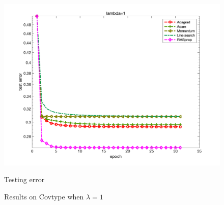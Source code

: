 \documentclass{article}
\begin{document}
\begin{figure}[H]
\begin{minipage}{0.33\linewidth}
		\includegraphics[width=1\linewidth]{./fig/err_c2}
		\caption{Testing error}
	\end{minipage}
	\caption*{Results on Covtype when $\lambda=1$}
\end{figure}
\end{document}
